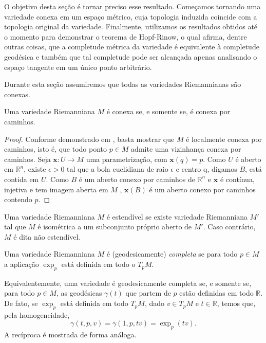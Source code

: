 O objetivo desta seção é tornar preciso esse resultado. Começamos tornando uma variedade conexa em um espaço métrico, cuja topologia induzida coincide com a topologia original da variedade. Finalmente, utilizamos os resultados obtidos até o momento para demonstrar o teorema de Hopf-Rinow, o qual afirma, dentre outras coisas, que a completude métrica da variedade é equivalente à completude geodésica e também que tal completude pode ser alcançada apenas analisando o espaço tangente em um único ponto arbitrário.

Durante esta seção assumiremos que todas as variedades Riemannianas são conexas.
\begin{lemma}
    \label{lem:conexidade}
    Uma variedade Riemanniana $M$ é conexa se, e somente se, é conexa por caminhos.
    \begin{proof}

        Conforme demonstrado em \textcite{munkres2000topology}, basta mostrar que $M$ é localmente conexa por caminhos, isto é, que todo ponto $p \in M$ admite uma vizinhança conexa por caminhos.
        Seja $\mathbf{x}:U\to M$ uma parametrização, com $\mathbf{x}(q)=p$. Como $U$ é aberto em $\mathbb{R}^{n}$, existe $\epsilon>0$ tal que a bola euclidiana de raio $\epsilon$ e centro q, digamos $B$, está contida em $U$. Como $B$ é um aberto conexo por caminhos de $\mathbb{R}^{n}$ e $\mathbf{x}$ é contínua, injetiva e tem imagem aberta em $M$ \parencite[p.~4, obs.~2.3]{doCarmo1992}, $\mathbf{x}(B)$ é um aberto conexo por caminhos contendo $p$.
    \end{proof}
\end{lemma}
\begin{definition}
    \label{def:variedade-estendivel}
    Uma variedade Riemanniana $M$ é estendível se existe variedade Riemanniana $M'$ tal que $M$ é isométrica a um subconjunto próprio aberto de $M'$. Caso contrário, $M$ é dita não estendível.
\end{definition}
\begin{definition}
    \label{def:geodesicamente-completa}
    Uma variedade Riemanniana $M$ é (geodesicamente) \emph{completa} se para todo $p \in M$ a aplicação $\exp_p$ está definida em todo o $T_pM$.
\end{definition}
Equivalentemente, uma variedade é geodesicamente completa se, e somente se, para todo $p \in M$, as geodésicas $\gamma(t)$ que partem de $p$ estão definidas em todo $\mathbb{R}$. De fato, se $\exp_p$ está definida em todo $T_pM$, dado $v \in T_pM$ e $t \in \mathbb{R}$, temos que, pela homogeneidade,
\begin{equation*}
    \gamma(t, p, v) = \gamma(1, p, tv) = \exp_p(tv).
\end{equation*}
A recíproca é mostrada de forma análoga.


